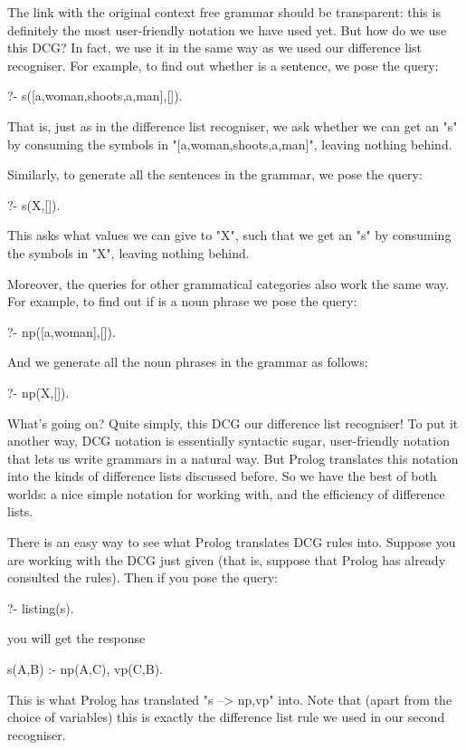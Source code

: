 The link with the original context free grammar should be transparent:
this is definitely the most user-friendly notation we have used yet.
But how do we use this DCG? In fact, we use it in 
the same way as we used our difference list recogniser.  For example,
to find out whether  is a sentence, we
pose the query:

\begin{LPNcodedisplay}
?- s([a,woman,shoots,a,man],[]).
\end{LPNcodedisplay}
That is, just as in the difference list recogniser, we ask
whether we can get an "s" by consuming the symbols in
"[a,woman,shoots,a,man]", leaving nothing behind.

Similarly, to generate all the sentences in the grammar,
we pose the query:
\begin{LPNcodedisplay}
?- s(X,[]).
\end{LPNcodedisplay}
This asks what values we can give to "X", such that we get an
"s" by consuming the symbols in "X", leaving nothing behind.

Moreover, the queries for other grammatical categories also work the
same way.  For example, to find out if  is a noun phrase
we pose the query:
\begin{LPNcodedisplay}
?- np([a,woman],[]).
\end{LPNcodedisplay}
And we generate all the noun phrases in the grammar as follows:
\begin{LPNcodedisplay}
?- np(X,[]).
\end{LPNcodedisplay}


What's going on?  Quite simply, this DCG  our difference
list recogniser!  To put it another way, DCG notation is essentially
syntactic sugar, user-friendly notation that lets us write grammars in
a natural way.  But Prolog translates this notation into the kinds of
difference lists discussed before.  So we have the best of both
worlds: a nice simple notation for working with, and the
efficiency of difference lists.

There is an easy way to see what Prolog translates DCG rules into.
Suppose you are working with the DCG just given (that is, suppose that
Prolog has already consulted the rules).  Then if you pose the query:
\begin{LPNcodedisplay}
?- listing(s).
\end{LPNcodedisplay}
you will get the response
\begin{LPNcodedisplay}
s(A,B) :-
    np(A,C),
    vp(C,B).
\end{LPNcodedisplay}
This is what Prolog has translated "s --> np,vp" into. Note
that (apart from the choice of variables) this is exactly the
difference list rule we used in our second recogniser.

